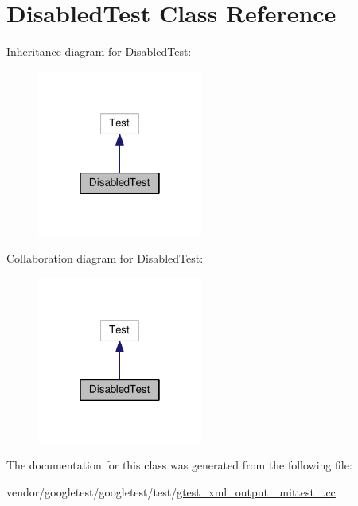 \hypertarget{classDisabledTest}{}\section{Disabled\+Test Class Reference}
\label{classDisabledTest}


Inheritance diagram for Disabled\+Test\+:\nopagebreak
\begin{figure}[H]
\begin{center}
\leavevmode
\includegraphics[width=154pt]{classDisabledTest__inherit__graph}
\end{center}
\end{figure}


Collaboration diagram for Disabled\+Test\+:\nopagebreak
\begin{figure}[H]
\begin{center}
\leavevmode
\includegraphics[width=154pt]{classDisabledTest__coll__graph}
\end{center}
\end{figure}


The documentation for this class was generated from the following file\+:\begin{DoxyCompactItemize}
\item 
vendor/googletest/googletest/test/\hyperlink{gtest__xml__output__unittest___8cc}{gtest\+\_\+xml\+\_\+output\+\_\+unittest\+\_\+.\+cc}\end{DoxyCompactItemize}

